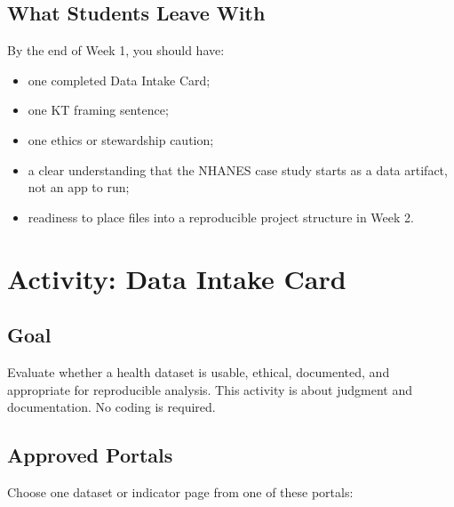 \documentclass[
  letterpaper,
  DIV=11,
  numbers=noendperiod,
  oneside]{scrreprt}
\providecommand{\tightlist}{%
  \setlength{\itemsep}{0pt}\setlength{\parskip}{0pt}}
\begin{document}
\section*{What Students Leave With}\label{what-students-leave-with}


By the end of Week 1, you should have:

\begin{itemize}
\tightlist
\item
  one completed Data Intake Card;
\item
  one KT framing sentence;
\item
  one ethics or stewardship caution;
\item
  a clear understanding that the NHANES case study starts as a data
  artifact, not an app to run;
\item
  readiness to place files into a reproducible project structure in Week
  2.
\end{itemize}

\chapter*{Activity: Data Intake Card}\label{activity-data-intake-card}


\section*{Goal}\label{goal}


Evaluate whether a health dataset is usable, ethical, documented, and
appropriate for reproducible analysis. This activity is about judgment
and documentation. No coding is required.

\section*{Approved Portals}\label{approved-portals}


Choose one dataset or indicator page from one of these portals:
\end{document}
